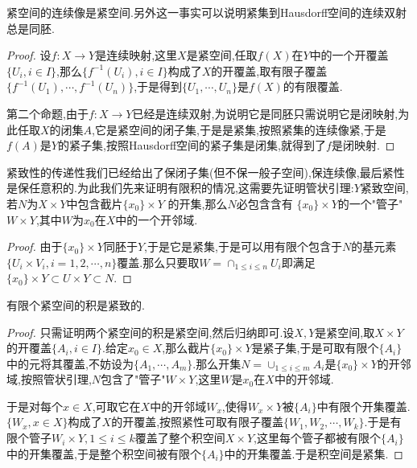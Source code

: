 紧空间的连续像是紧空间.另外这一事实可以说明紧集到Hausdorff空间的连续双射总是同胚.
\begin{proof}
	
	设$f:X\to Y$是连续映射,这里$X$是紧空间,任取$f(X)$在$Y$中的一个开覆盖$\{U_i,i\in I\}$,那么$\{f^{-1}(U_i),i\in I\}$构成了$X$的开覆盖,取有限子覆盖$\{f^{-1}(U_1),\cdots,f^{-1}(U_n)\}$,于是得到$\{U_1,\cdots,U_n\}$是$f(X)$的有限覆盖.
	
	第二个命题,由于$f:X\to Y$已经是连续双射,为说明它是同胚只需说明它是闭映射,为此任取$X$的闭集$A$,它是紧空间的闭子集,于是是紧集,按照紧集的连续像紧,于是$f(A)$是$Y$的紧子集,按照Hausdorff空间的紧子集是闭集,就得到了$f$是闭映射.
\end{proof}

紧致性的传递性我们已经给出了保闭子集(但不保一般子空间),保连续像,最后紧性是保任意积的.为此我们先来证明有限积的情况,这需要先证明管状引理:$Y$紧致空间,若$N$为$X\times Y$中包含截片$\{x_0\}\times Y$ 的开集,那么$N$必包含含有
$\{x_0\}\times Y$的一个"管子"$W\times Y$,其中$W$为$x_0$在$X$中的一个开邻域.
\begin{proof}
	
	由于$\{x_0\}\times Y$同胚于$Y$,于是它是紧集,于是可以用有限个包含于$N$的基元素$\{U_i\times V_i,i=1,2,\cdots,n\}$覆盖.那么只要取$W=\cap_{1\le i\le n}U_i$即满足$\{x_0\}\times Y\subset U\times Y\subset N$.
\end{proof}

有限个紧空间的积是紧致的.
\begin{proof}
	
	只需证明两个紧空间的积是紧空间,然后归纳即可.设$X,Y$是紧空间,取$X\times Y$的开覆盖$\{A_i,i\in I\}$.给定$x_0\in X$,那么截片$\{x_0\}\times Y$是紧子集,于是可取有限个$\{A_i\}$中的元将其覆盖,不妨设为$\{A_1,\cdots,A_m\}$.那么开集$N=\cup_{1\le i\le m}A_i$是$\{x_0\}\times Y$的开邻域,按照管状引理,$N$包含了"管子"$W\times Y$,这里$W$是$x_0$在$X$中的开邻域.
	
	于是对每个$x\in X$,可取它在$X$中的开邻域$W_x$,使得$W_x\times Y$被$\{A_i\}$中有限个开集覆盖.$\{W_x,x\in X\}$构成了$X$的开覆盖,按照紧性可取有限子覆盖$\{W_1,W_2,\cdots,W_k\}$.于是有限个管子$W_i\times Y,1\le i\le k$覆盖了整个积空间$X\times Y$,这里每个管子都被有限个$\{A_i\}$中的开集覆盖,于是整个积空间被有限个$\{A_i\}$中的开集覆盖.于是积空间是紧集.
\end{proof}

